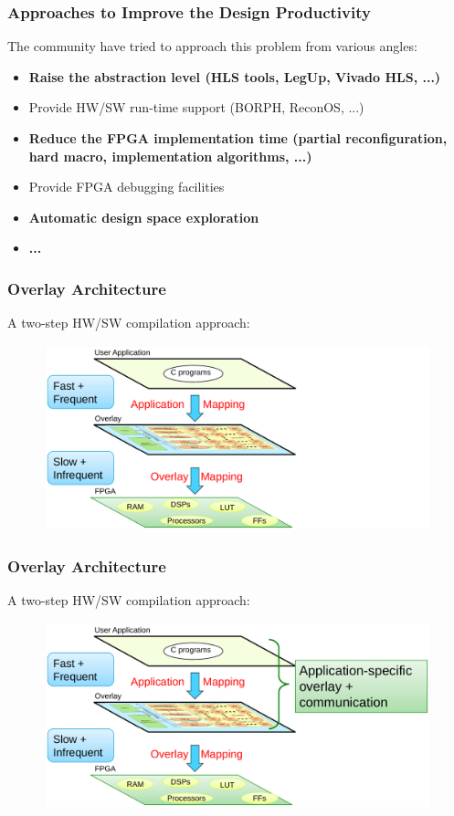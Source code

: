 \documentclass[accentcolor=tud1a,colorbacktitle,inverttitle,landscape,german,presentation,t]{tudbeamer}
\begin{document}
   \begin{frame}
   \frametitle{Approaches to Improve the Design Productivity}
   The community have tried to approach this problem from various angles:
   \vspace{0.6em}
   \begin{itemize}
   \item \textbf{Raise the abstraction level (HLS tools, LegUp, Vivado HLS, ...)}
   \item Provide HW/SW run-time support (BORPH, ReconOS, ...)
   \item \textbf{Reduce the FPGA implementation time (partial reconfiguration, hard macro, implementation algorithms, ...)}
   \item Provide FPGA debugging facilities
   \item \textbf{Automatic design space exploration}
   \item \textbf{...}
   \end{itemize}

   \vspace{2em}
   {}
   \end{frame}
   
   \begin{frame}
   \frametitle{Overlay Architecture}
   A two-step HW/SW compilation approach:
   \begin{figure}
      \includegraphics[width=.9\linewidth]{overlay-architecture1}
   \end{figure}
   \end{frame}

   \begin{frame}
   \frametitle{Overlay Architecture}
   A two-step HW/SW compilation approach:
   \begin{figure}
      \includegraphics[width=.9\linewidth]{overlay-architecture2}
   \end{figure}
   \end{frame}
   
\end{document}
